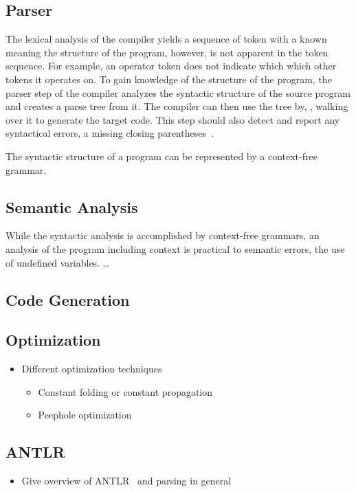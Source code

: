 \subsection{Parser}
The lexical analysis of the compiler yields a sequence of token with a known meaning the structure of the program, however, is not apparent in the token sequence. For example, an operator token does not indicate which which other tokens it operates on. To gain knowledge of the structure of the program, the parser step of the compiler analyzes the syntactic structure of the source program and creates a parse tree from it. 
The compiler can then use the tree by, \eg, walking over it to generate the target code. This step should also detect and report any syntactical errors, \eg a missing closing parentheses~\cite{VSSD07}.

The syntactic structure of a program can be represented by a context-free grammar.

\subsection{Semantic Analysis}
While the syntactic analysis is accomplished by context-free grammars, an analysis of the program including context is practical to semantic errors, \eg the use of undefined variables. \dots

\subsection{Code Generation}

\subsection{Optimization}
\label{sec:background_compiler_codeOptimization}
\begin{itemize}
    \item Different optimization techniques
    \begin{itemize}
        \item Constant folding or constant propagation
        \item Peephole optimization
    \end{itemize}
\end{itemize}

\subsection{ANTLR}
\begin{itemize}
    \item Give overview of ANTLR~\cite{PaQu95} and parsing in general
\end{itemize}